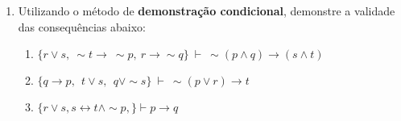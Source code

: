 \documentclass[12pt, a4paper,final]{article}
\begin{document}
\begin{enumerate}
\begin{enumerate}

\end{enumerate}


 \item Utilizando o m\'etodo de {\bf demonstra\c c\~ao condicional}, demonstre a validade das consequ\^encias abaixo:
 
\begin{enumerate}










\item $\{r \vee s, ~ \sim t \rightarrow ~ \sim p,
   ~ r \rightarrow \sim q \} ~\vdash~ \sim (p \wedge q) \rightarrow (s \wedge t) $ 


\item $\{ q \rightarrow p,\:\: t \vee s,\:\: q \vee\sim s \} ~\vdash~ \sim (p \vee r) \rightarrow t$



\item $\{ r \vee s, s \leftrightarrow t \wedge \sim p, \} \vdash p \rightarrow q$



\end{enumerate}
\end{enumerate}
\end{document}
